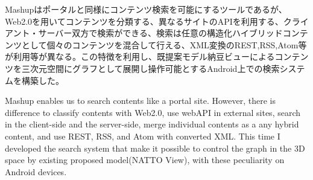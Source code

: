 
\begin{jabstract}
Mashupはポータルと同様にコンテンツ検索を可能にするツールであるが、Web2.0を用いてコンテンツを分類する、異なるサイトのAPIを利用する、クライアント・サーバー双方で検索ができる、検索は任意の構造化ハイブリッドコンテンツとして個々のコンテンツを混合して行える、XML変換のREST,RSS,Atom等が利用等が異なる。この特徴を利用し、既提案モデル納豆ビューによるコンテンツを三次元空間にグラフとして展開し操作可能とするAndroid上での検索システムを構築した。
\end{jabstract}

\begin{eabstract}
Mashup enables us to search contents like a portal site. However, there is difference to classify contents with Web2.0, use webAPI in external sites, search in the client-side and  the server-side, merge individual contents as a any hybrid content, and use REST, RSS, and Atom with converted XML. This time I developed the search system that make it possible to control the graph in the 3D space by existing proposed model(NATTO View), with these peculiarity on Android devices.
\end{eabstract}

